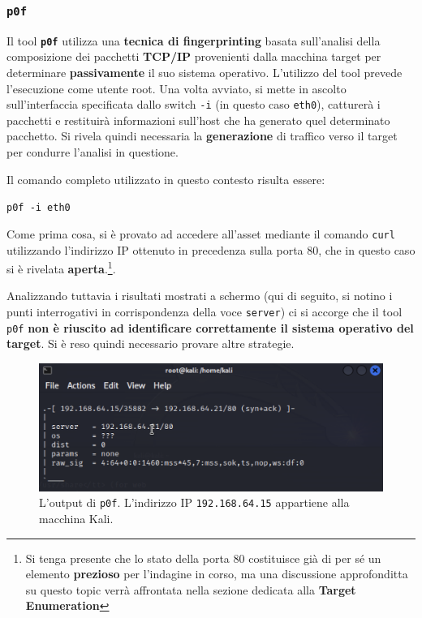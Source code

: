 \documentclass[a4paper, 12pt, oneside]{article}
\begin{document}
\subsubsection{\texttt{p0f}}
Il tool \textbf{\texttt{p0f}} utilizza una \textbf{tecnica di fingerprinting} basata sull'analisi della composizione dei pacchetti \textbf{TCP\slash IP} provenienti dalla macchina target per determinare \textbf{passivamente} il suo sistema operativo\cite{p0f}. L'utilizzo del tool prevede l'esecuzione come utente root. Una volta avviato, si mette in ascolto sull'interfaccia specificata dallo switch \texttt{-i} (in questo caso \texttt{eth0}), catturerà i pacchetti e restituirà informazioni sull'host che ha generato quel determinato pacchetto. Si rivela quindi necessaria la \textbf{generazione} di traffico verso il target per condurre l'analisi in questione. 

Il comando completo utilizzato in questo contesto risulta essere:

\begin{center}
    \texttt{p0f -i eth0}
\end{center}

Come prima cosa, si è provato ad accedere all'asset mediante il comando \texttt{curl} utilizzando l'indirizzo IP ottenuto in precedenza sulla porta 80, che in questo caso si è rivelata \textbf{aperta}.\footnote{Si tenga presente che lo stato della porta 80 costituisce già di per sé un elemento \textbf{prezioso} per l'indagine in corso, ma una discussione approfonditta su questo topic verrà affrontata nella sezione dedicata alla \textbf{Target Enumeration}}.


Analizzando tuttavia i risultati mostrati a schermo (qui di seguito, si notino i punti interrogativi in corrispondenza della voce \texttt{server}) ci si accorge che il tool \texttt{p0f} \textbf{non è riuscito ad identificare correttamente il sistema operativo del target}. Si è reso quindi necessario provare altre strategie.

\begin{figure}[h!]
    \centering
    \includegraphics[width=\textwidth]{img/p0f.png}
    \caption{L'output di \texttt{p0f}. L'indirizzo IP \texttt{192.168.64.15} appartiene alla macchina Kali.}
\end{figure}
\end{document}
